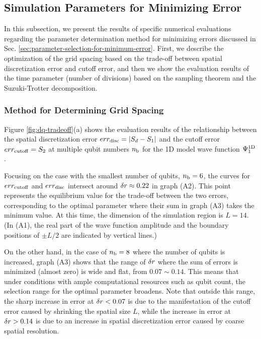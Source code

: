 \documentclass[wabun2025.tex]{subfiles}
\begin{document}
\subsection{Simulation Parameters for Minimizing Error}
\label{subsec:parameter-selection-for-minimum-error-results}
In this subsection, we present the results of specific numerical evaluations
regarding the parameter determination method for minimizing errors discussed in
Sec. \ref{sec:parameter-selection-for-minimum-error}. First, we describe the
optimization of the grid spacing based on the trade-off between spatial
discretization error and cutoff error, and then we show the evaluation results
of the time parameter (number of divisions) based on the sampling theorem and
the Suzuki-Trotter decomposition.

\subsubsection{Method for Determining Grid Spacing}
\label{subsubsec:delta-r-selection-results}

Figure \ref{fig:dq-tradeoff}(a) shows the evaluation results of the relationship
between the spatial discretization error $err_{\mathrm{disc}} = |S_d-S_1|$ and the cutoff
error $err_{\mathrm{cutoff}} = S_2$ at multiple qubit numbers $n_{\mathrm{b}}$ for the 1D model wave
function $\Psi^{\mathrm{1D}}_1$.

Focusing on the case with the smallest number of qubits, $n_{\mathrm{b}}=6$, the curves for
$err_{\mathrm{cutoff}}$ and $err_{\mathrm{disc}}$ intersect around $\delta r \approx 0.22$ in graph
(A2). This point represents the equilibrium value for the trade-off between the
two errors, corresponding to the optimal parameter where their sum in graph (A3)
takes the minimum value. At this time, the dimension of the simulation region is
$L=14$. (In (A1), the real part of the wave function amplitude and the boundary
positions of $\pm L/2$ are indicated by vertical lines.)

On the other hand, in the case of $n_{\mathrm{b}}=8$ where the number of qubits is
increased, graph (A3) shows that the range of $\delta r$ where the sum of errors
is minimized (almost zero) is wide and flat, from $0.07 \sim 0.14$. This means
that under conditions with ample computational resources such as qubit count,
the selection range for the optimal parameter broadens. Note that outside this
range, the sharp increase in error at $\delta r < 0.07$ is due to the
manifestation of the cutoff error caused by shrinking the spatial size $L$,
while the increase in error at $\delta r > 0.14$ is due to an increase in spatial
discretization error caused by coarse spatial resolution.
\end{document}
